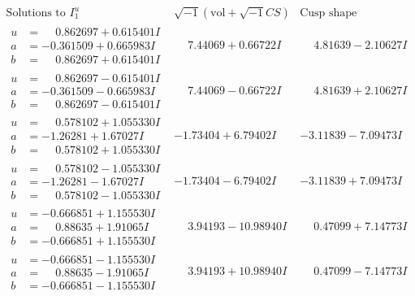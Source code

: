 \documentclass[1p]{elsarticle_modified}
\theoremstyle{definition}
\newcommand{\I}{\sqrt{-1}}
\begin{document}
$$\begin{array}{c|c|c}  
\text{Solutions to }I^u_{1}& \I (\text{vol} + \sqrt{-1}CS) & \text{Cusp shape}\\
 \hline 
\begin{aligned}
u &= \phantom{-}0.862697 + 0.615401 I \\
a &= -0.361509 + 0.665983 I \\
b &= \phantom{-}0.862697 + 0.615401 I\end{aligned}
 & \phantom{-}7.44069 + 0.66722 I & \phantom{-}4.81639 - 2.10627 I \\ \hline\begin{aligned}
u &= \phantom{-}0.862697 - 0.615401 I \\
a &= -0.361509 - 0.665983 I \\
b &= \phantom{-}0.862697 - 0.615401 I\end{aligned}
 & \phantom{-}7.44069 - 0.66722 I & \phantom{-}4.81639 + 2.10627 I \\ \hline\begin{aligned}
u &= \phantom{-}0.578102 + 1.055330 I \\
a &= -1.26281 + 1.67027 I \\
b &= \phantom{-}0.578102 + 1.055330 I\end{aligned}
 & -1.73404 + 6.79402 I & -3.11839 - 7.09473 I \\ \hline\begin{aligned}
u &= \phantom{-}0.578102 - 1.055330 I \\
a &= -1.26281 - 1.67027 I \\
b &= \phantom{-}0.578102 - 1.055330 I\end{aligned}
 & -1.73404 - 6.79402 I & -3.11839 + 7.09473 I \\ \hline\begin{aligned}
u &= -0.666851 + 1.155530 I \\
a &= \phantom{-}0.88635 + 1.91065 I \\
b &= -0.666851 + 1.155530 I\end{aligned}
 & \phantom{-}3.94193 - 10.98940 I & \phantom{-}0.47099 + 7.14773 I \\ \hline\begin{aligned}
u &= -0.666851 - 1.155530 I \\
a &= \phantom{-}0.88635 - 1.91065 I \\
b &= -0.666851 - 1.155530 I\end{aligned}
 & \phantom{-}3.94193 + 10.98940 I & \phantom{-}0.47099 - 7.14773 I \\ \hline\begin{aligned}

\end{aligned}
\end{array}$$
\end{document}
